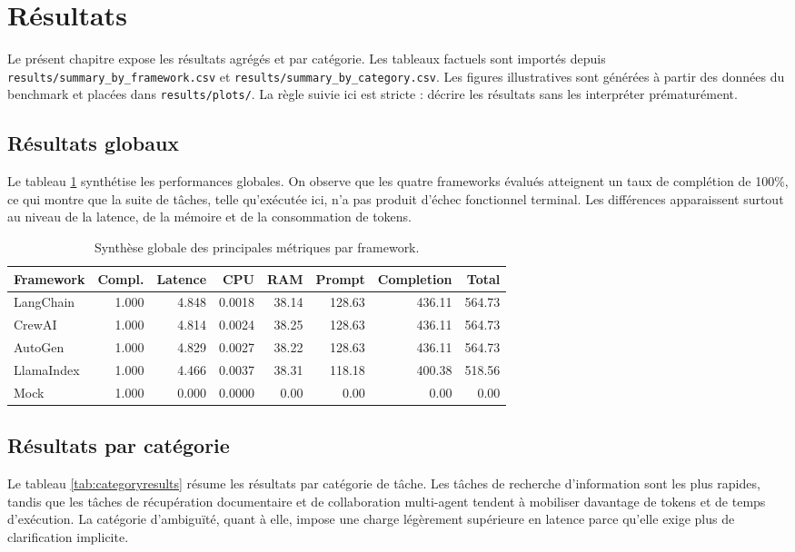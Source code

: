 \documentclass[11pt,a4paper]{article}
\begin{document}
\section{Résultats}
\label{sec:resultats}
Le présent chapitre expose les résultats agrégés et par catégorie. Les tableaux factuels sont importés depuis \texttt{results/summary\_by\_framework.csv} et \texttt{results/summary\_by\_category.csv}. Les figures illustratives sont générées à partir des données du benchmark et placées dans \texttt{results/plots/}. La règle suivie ici est stricte : décrire les résultats sans les interpréter prématurément.

\subsection{Résultats globaux}
Le tableau \ref{tab:globalresults} synthétise les performances globales. On observe que les quatre frameworks évalués atteignent un taux de complétion de 100\%, ce qui montre que la suite de tâches, telle qu'exécutée ici, n'a pas produit d'échec fonctionnel terminal. Les différences apparaissent surtout au niveau de la latence, de la mémoire et de la consommation de tokens.

\begin{table}[H]
\centering
\small
\begin{tabularx}{\textwidth}{@{}lrrrrrrr@{}}
\toprule
Framework & Compl. & Latence & CPU & RAM & Prompt & Completion & Total \\
\midrule
LangChain & 1.000 & 4.848 & 0.0018 & 38.14 & 128.63 & 436.11 & 564.73 \\
CrewAI & 1.000 & 4.814 & 0.0024 & 38.25 & 128.63 & 436.11 & 564.73 \\
AutoGen & 1.000 & 4.829 & 0.0027 & 38.22 & 128.63 & 436.11 & 564.73 \\
LlamaIndex & 1.000 & 4.466 & 0.0037 & 38.31 & 118.18 & 400.38 & 518.56 \\
Mock & 1.000 & 0.000 & 0.0000 & 0.00 & 0.00 & 0.00 & 0.00 \\
\bottomrule
\end{tabularx}
\caption{Synthèse globale des principales métriques par framework.}
\label{tab:globalresults}
\end{table}

\subsection{Résultats par catégorie}
Le tableau \ref{tab:categoryresults} résume les résultats par catégorie de tâche. Les tâches de recherche d'information sont les plus rapides, tandis que les tâches de récupération documentaire et de collaboration multi-agent tendent à mobiliser davantage de tokens et de temps d'exécution. La catégorie d'ambiguïté, quant à elle, impose une charge légèrement supérieure en latence parce qu'elle exige plus de clarification implicite.
\end{document}
